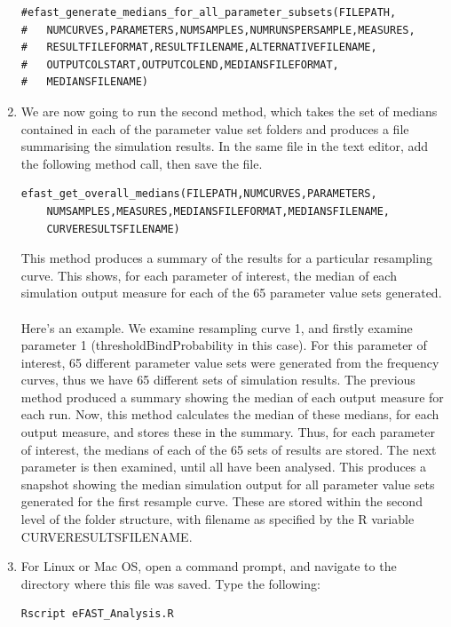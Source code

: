 \documentclass[a4paper,11pt]{article}
\begin{document}
\begin{enumerate}
\begin{verbatim}
#efast_generate_medians_for_all_parameter_subsets(FILEPATH,
#	NUMCURVES,PARAMETERS,NUMSAMPLES,NUMRUNSPERSAMPLE,MEASURES,
#	RESULTFILEFORMAT,RESULTFILENAME,ALTERNATIVEFILENAME,
#	OUTPUTCOLSTART,OUTPUTCOLEND,MEDIANSFILEFORMAT,
#	MEDIANSFILENAME)
\end{verbatim}

\item We are now going to run the second method, which takes the set of medians contained in each of the parameter value set folders and produces a file summarising the simulation results. In the same file in the text editor, add the following method call, then save the file.

\begin{verbatim}
efast_get_overall_medians(FILEPATH,NUMCURVES,PARAMETERS,
	NUMSAMPLES,MEASURES,MEDIANSFILEFORMAT,MEDIANSFILENAME,
	CURVERESULTSFILENAME)
\end{verbatim}

This method produces a summary of the results for a particular resampling curve. This shows, for each parameter of interest, the median of each simulation output measure for each of the 65 parameter value sets generated.\\
\\
Here's an example. We examine resampling curve 1, and firstly examine parameter 1 (thresholdBindProbability in this case). For this parameter of interest, 65 different parameter value sets were generated from the frequency curves, thus we have 65 different sets of simulation results. The previous method produced a summary showing the median of each output measure for each run. Now, this method calculates the median of these medians, for each output measure, and stores these in the summary. Thus, for each parameter of interest, the medians of each of the 65 sets of results are stored. The next parameter is then examined, until all have been analysed. This produces a snapshot showing the median simulation output for all parameter value sets generated for the first resample curve. These are stored within the second level of the folder structure, with filename as specified by the R variable CURVERESULTSFILENAME.

\item For Linux or Mac OS, open a command prompt, and navigate to the directory where this file was saved.  Type the following:

\begin{verbatim}
Rscript eFAST_Analysis.R
\end{verbatim}


\end{enumerate}
\end{document}
